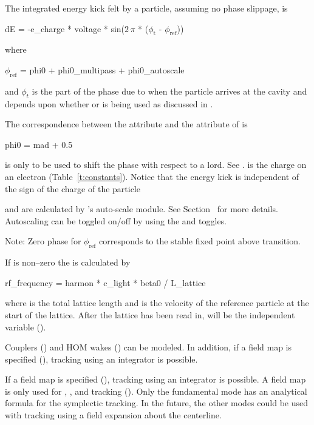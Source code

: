{The integrated energy kick felt by a particle, assuming no phase slippage, is 
\begin{example}
  dE = -e_charge * voltage * sin(\(2\,\pi\) * (\(\phi_\text{t}\) - \(\phi_\text{ref}\)))
\end{example}
where
\begin{example}
  \(\phi_\text{ref}\) = phi0 + phi0_multipass + phi0_autoscale
  \label{rfcav.phi}
\end{example}
and $\phi_t$ is the part of the phase due to when the particle arrives at the cavity and depends
upon whether  or  is being used as discussed
in .

The correspondence between the \bmad {} attribute and the  attribute of
\mad is
\begin{example}
  phi0 = mad + 0.5
\end{example}

 is only to be used to shift the phase with respect to a  lord. See
.  is the charge on an electron (Table~\ref{t:constants}). Notice
that the energy kick is independent of the sign of the charge of the particle

 and  are calculated by \bmad's auto-scale module. See
Section~ for more details. Autoscaling can be toggled on/off by using the
 and  toggles.

Note: Zero phase for $\phi_\text{ref}$ corresponds to the stable fixed point above transition.

If  is non--zero the  is calculated by
\begin{example}
  rf_frequency = harmon * c_light * beta0 / L_lattice 
\end{example}
where  is the total lattice length and  is the
velocity of the reference particle at the start of the lattice. After
the lattice has been read in,  will be the
independent variable ().

Couplers () and HOM wakes () can
be modeled. In addition, if a field map is specified
(), tracking using an integrator is possible.

If a field map is specified (), tracking using an integrator is possible. A field
map is only used for , , and 
tracking ().  Only the fundamental mode has an analytical formula for the symplectic
tracking. In the future, the other modes could be used with  tracking using a
field expansion about the centerline.

}
